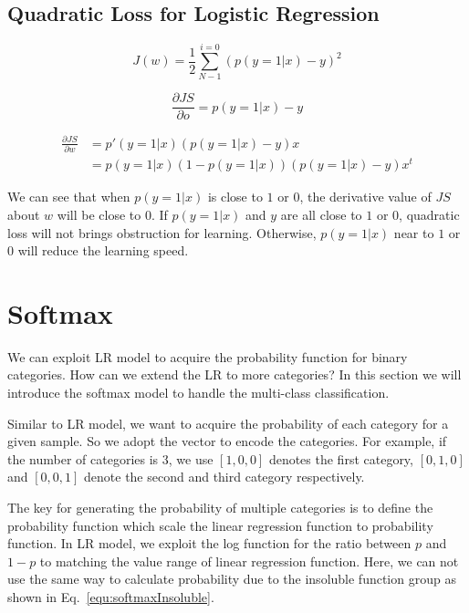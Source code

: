 \documentclass[runningheads,openany]{xhlPaper}
\begin{document}
\subsection{Quadratic Loss for Logistic Regression}

\begin{displaymath}
J\left ( w \right ) = \frac{1}{2} \sum_{N-1}^{i = 0} \left ( p\left ( y=1|x \right ) - y \right ) ^ 2
\end{displaymath}

\begin{displaymath}
\frac{\partial JS}{\partial o} = p\left ( y=1|x \right ) - y
\end{displaymath}

\begin{displaymath}
\begin{aligned}
\frac{\partial JS}{\partial w}&={p}{'}\left ( y=1|x \right )\left ( p\left ( y=1|x \right ) - y \right )x\\
&=p\left ( y=1|x \right )\left ( 1 - p\left ( y=1|x \right ) \right )\left ( p\left ( y=1|x \right ) - y \right )x^t
\end{aligned}
\end{displaymath}

We can see that when $p\left ( y=1|x \right )$ is close to $1$ or $0$, the derivative value of $JS$ about $w$ will be close to $0$. If $p\left ( y=1|x \right )$ and $y$ are all close to $1$ or $0$, quadratic loss will not brings obstruction for learning. Otherwise, $p\left ( y=1|x \right )$ near to $1$ or $0$ will reduce the learning speed.

\section{Softmax}
We can exploit LR model to acquire the probability function for binary categories. How can we extend the LR to more categories? In this section we will introduce the softmax model to handle the multi-class classification.

Similar to LR model, we want to acquire the probability of each category for a given sample. So we adopt the vector to encode the categories. For example, if the number of categories is 3, we use $\left[1, 0, 0\right]$ denotes the first category, $\left[0, 1, 0\right]$ and $\left[0, 0, 1\right]$ denote the second and third category respectively.

The key for generating the probability of multiple categories is to define the probability function which scale the linear regression function to probability function. In LR model, we exploit the log function for the ratio between $p$ and $1 - p$ to matching the value range of linear regression function. Here, we can not use the same way to calculate probability due to the insoluble function group as shown in Eq.~\ref{equ:softmaxInsoluble}.
\end{document}
